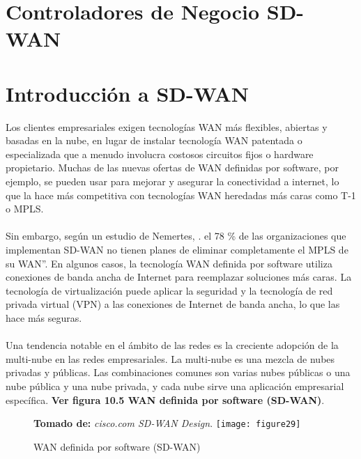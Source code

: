 \section{Controladores de Negocio SD-WAN}
\label{cha:Controladores de Negocio SD-WAN}


\section{Introducción a SD-WAN}
\label{sec:Introducción a SD-WAN}

Los clientes empresariales exigen tecnologías WAN más flexibles, abiertas y basadas en la nube, en lugar de instalar tecnología WAN patentada o especializada que a menudo involucra costosos circuitos fijos o hardware propietario. Muchas de las nuevas ofertas de WAN definidas por software, por ejemplo, se pueden usar para mejorar y asegurar la conectividad a internet, lo que la hace más competitiva
con tecnologías WAN heredadas más caras como T-1 o MPLS.
\\
\\
Sin embargo, según un estudio de Nemertes, . el 78 \% de las organizaciones que implementan SD-WAN no tienen planes de eliminar completamente el MPLS de su WAN”. En algunos casos, la tecnología WAN definida por software utiliza conexiones de banda ancha de Internet para reemplazar soluciones más caras. La tecnología de virtualización puede aplicar la seguridad y la tecnología de red privada virtual (VPN) a las conexiones
de Internet de banda ancha, lo que las hace más seguras.
\\
\\
Una tendencia notable en el ámbito de las redes es la creciente adopción de la multi-nube en las redes empresariales. La multi-nube es una mezcla de nubes privadas y públicas. Las combinaciones comunes son varias nubes públicas o una nube pública y una nube privada, y cada nube sirve una aplicación empresarial específica.
\textbf{Ver figura 10.5 WAN definida por software (SD-WAN)}.


\begin{figure}[htbp]
 \footnotesize{\textbf{Tomado de:} \textit{cisco.com SD-WAN Design}.}
  \centering
    {\texttt{[image: figure29]}}%
  \caption{\footnotesize{WAN definida por software (SD-WAN)}}
  \label{fig:fig2subfig}
\end{figure}

